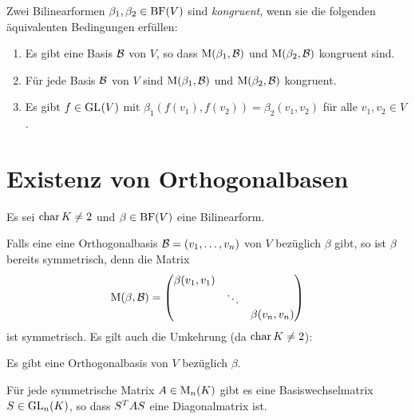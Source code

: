\begin{definition}
  Zwei Bilinearformen $\beta_1, \beta_2 \in \operatorname{BF}(V)$ sind \emph{kongruent}, wenn sie die folgenden äquivalenten Bedingungen erfüllen:
  \begin{enumerate}
    \item
      Es gibt eine Basis $\mathcal{B}$ von $V$, so dass $\operatorname{M}(\beta_1, \mathcal{B})$ und $\operatorname{M}(\beta_2, \mathcal{B})$ kongruent sind.
    \item
      Für jede Basis $\mathcal{B}$ von $V$ sind $\operatorname{M}(\beta_1, \mathcal{B})$ und $\operatorname{M}(\beta_2, \mathcal{B})$ kongruent.
    \item
      Es gibt $f \in \operatorname{GL}_{}(V)$ mit $\beta_1( f(v_1), f(v_2) ) = \beta_2( v_1, v_2 )$ für alle $v_1, v_2 \in V$.
  \end{enumerate}
\end{definition}





\section{Existenz von Orthogonalbasen}

Es sei $\operatorname{char} K \neq 2$ und $\beta \in \operatorname{BF}(V)$ eine Bilinearform.

Falls eine eine Orthogonalbasis $\mathcal{B} = (v_1, \dotsc, v_n)$ von $V$ bezüglich $\beta$ gibt, so ist $\beta$ bereits symmetrisch, denn die Matrix
\[
    \operatorname{M}(\beta, \mathcal{B})
  = \begin{pmatrix}
      \beta(v_1, v_1) &         &                 \\
                      & \ddots  &                 \\
                      &         & \beta(v_n, v_n)
    \end{pmatrix}
\]
ist symmetrisch.
Es gilt auch die Umkehrung (da $\operatorname{char} K \neq 2$):

\begin{theorem}
  \label{theorem: exstience of an orthogonal basis}
  Es gibt eine Orthogonalbasis von $V$ bezüglich $\beta$.
\end{theorem}

\begin{corollary}
  \label{corollary: every symmetric matrix is congruent to a diagonal matrix}
  Für jede symmetrische Matrix $A \in \operatorname{M}_{n}(K)$ gibt es eine Basiswechselmatrix $S \in \operatorname{GL}_{n}(K)$, so dass $S^T A S$ eine Diagonalmatrix ist.
\end{corollary}

